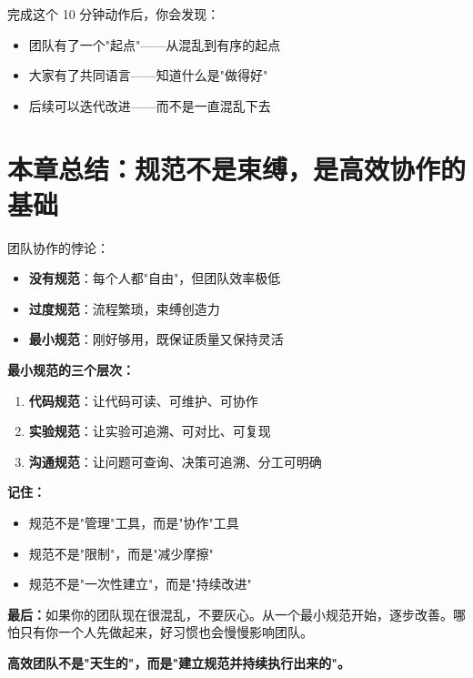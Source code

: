 完成这个 10 分钟动作后，你会发现：
\begin{itemize}
  \item 团队有了一个"起点"——从混乱到有序的起点
  \item 大家有了共同语言——知道什么是"做得好"
  \item 后续可以迭代改进——而不是一直混乱下去
\end{itemize}

\section{本章总结：规范不是束缚，是高效协作的基础}

团队协作的悖论：
\begin{itemize}
  \item \textbf{没有规范}：每个人都"自由"，但团队效率极低
  \item \textbf{过度规范}：流程繁琐，束缚创造力
  \item \textbf{最小规范}：刚好够用，既保证质量又保持灵活
\end{itemize}

\textbf{最小规范的三个层次：}
\begin{enumerate}
  \item \textbf{代码规范}：让代码可读、可维护、可协作
  \item \textbf{实验规范}：让实验可追溯、可对比、可复现
  \item \textbf{沟通规范}：让问题可查询、决策可追溯、分工可明确
\end{enumerate}

\textbf{记住：}
\begin{itemize}
  \item 规范不是"管理"工具，而是"协作"工具
  \item 规范不是"限制"，而是"减少摩擦"
  \item 规范不是"一次性建立"，而是"持续改进"
\end{itemize}

\textbf{最后：}如果你的团队现在很混乱，不要灰心。从一个最小规范开始，逐步改善。哪怕只有你一个人先做起来，好习惯也会慢慢影响团队。

\textbf{高效团队不是"天生的"，而是"建立规范并持续执行出来的"。}
